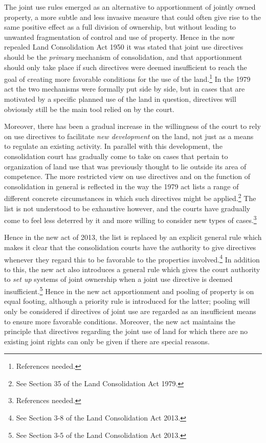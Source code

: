 The joint use rules emerged as an alternative to apportionment of jointly owned property, a more subtle and less invasive measure that could often give rise to the same positive effect as a full division of ownership, but without leading to unwanted fragmentation of control and use of property. Hence in the now repealed Land Consolidation Act 1950 it was stated that joint use directives should be the \emph{primary} mechanism of consolidation, and that apportionment should only take place if such directives were deemed insufficient to reach the goal of creating more favorable conditions for the use of the land.\footnote{References needed.} In the 1979 act the two mechanisms were formally put side by side, but in cases that are motivated by a specific planned use of the land in question, directives will obviously still be the main tool relied on by the court.

Moreover, there has been a gradual increase in the willingness of the court to rely on use directives to facilitate \emph{new development} on the land, not just as a means to regulate an existing activity. In parallel with this development, the consolidation court has gradually come to take on cases that pertain to organization of land use that was previously thought to lie outside its area of competence. The more restricted view on use directives and on the function of consolidation in general is reflected in the way the 1979 act lists a range of different concrete circumstances in which such directives might be applied.\footnote{See Section 35 of the Land Consolidation Act 1979.} The list is not understood to be exhaustive however, and the courts have gradually come to feel less deterred by it and more willing to consider new types of cases.\footnote{References needed.}

Hence in the new act of 2013, the list is replaced by an explicit general rule which makes it clear that the  consolidation courts have the authority to give directives whenever they regard this to be favorable to the properties involved.\footnote{See Section 3-8 of the Land Consolidation Act 2013.} In addition to this, the new act also introduces a general rule which gives the court authority to \emph{set up} systems of joint ownership when a joint use directive is deemed insufficient.\footnote{See Section 3-5 of the Land Consolidation Act 2013.} Hence in the new act apportionment and pooling of property is on equal footing, although a priority rule is introduced for the latter; pooling will only be considered if directives of joint use are regarded as an insufficient means to ensure more favorable conditions. Moreover, the new act maintains the principle that directives regarding the joint use of land for which there are no existing joint rights can only be given if there are special reasons.

